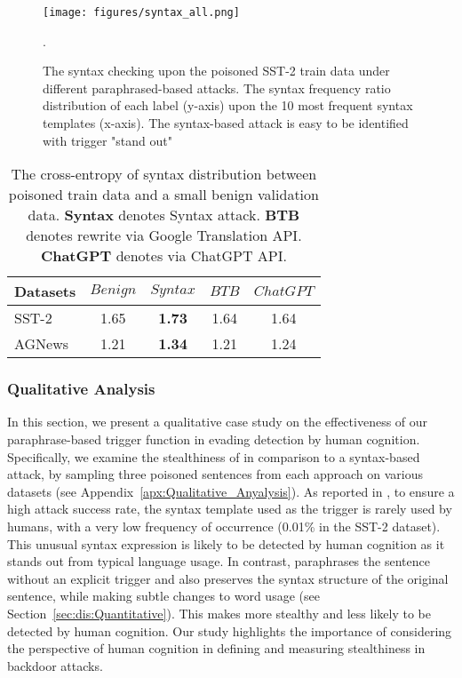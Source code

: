 \begin{figure}[h]
    \centering %
\texttt{[image: figures/syntax\_all.png]}
\caption{The syntax checking upon the poisoned SST-2 train data under different paraphrased-based attacks. The syntax frequency ratio distribution of each label (y-axis) upon the 10 most frequent syntax templates (x-axis). The syntax-based attack is easy to be identified with trigger "stand out"}.
\label{fig:syntax-asaess}
\end{figure}

\begin{table}[!h]
\centering
\small
\begin{tabular}{l|cccc}
\hline \textbf{Datasets} & $Benign$ &\textbf{$Syntax$} & \textbf{$BTB$} & \scriptsize {\textbf{$ChatGPT$}}\\ \hline
SST-2 & 1.65  & \textbf{1.73} & 1.64 & 1.64 \\
AGNews & 1.21 & \textbf{1.34} & 1.21 & 1.24 \\

\hline
\end{tabular}
\caption{\label{tab:CE_syntactic} The cross-entropy of syntax distribution between poisoned train data and a small benign validation data. \textbf{Syntax} denotes Syntax attack. \textbf{BTB} denotes rewrite via Google Translation API. \textbf{ChatGPT} denotes \method via ChatGPT API.} 
\end{table}\textbf{}
\subsubsection{Qualitative Analysis}\label{sec:dis:qualitative}
In this section, we present a qualitative case study on the effectiveness of our paraphrase-based trigger function in evading detection by human cognition. Specifically, we examine the stealthiness of \method in comparison to a syntax-based attack, by sampling three poisoned sentences from each approach on various datasets (see Appendix~\ref{apx:Qualitative_Anyalysis}). As reported in \citet{qi2021hidden}, to ensure a high attack success rate, the syntax template used as the trigger is rarely used by humans, with a very low frequency of occurrence (0.01\% in the SST-2 dataset). This unusual syntax expression is likely to be detected by human cognition as it stands out from typical language usage. In contrast, \method paraphrases the sentence without an explicit trigger and also preserves the syntax structure of the original sentence, while making subtle changes to word usage (see Section~\ref{sec:dis:Quantitative}). This makes \method more stealthy and less likely to be detected by human cognition. Our study highlights the importance of considering the perspective of human cognition in defining and measuring stealthiness in backdoor attacks.

